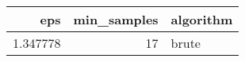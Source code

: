 \begin{tabular}{rrl}
\toprule
eps & min_samples & algorithm \\
\midrule
1.347778 & 17 & brute \\
\bottomrule
\end{tabular}
